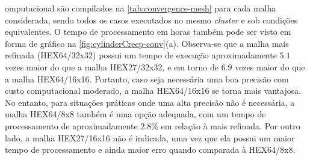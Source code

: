 \documentclass[Tese.tex]{subfiles}
\begin{document}
{omputacional são compilados na \autoref{tab:convergence-mesh} para cada malha considerada, sendo todos os casos executados no mesmo \emph{cluster} e sob condições equivalentes. O tempo de processamento em horas também pode ser visto em forma de gráfico na \cref{fig:cylinderCreep-conv}(a). Observa-se que a malha mais refinada (HEX64/32x32) possui um tempo de execução aproximadamente $5.1$ vezes maior do que a malha HEX27/32x32, e em torno de $6.9$ vezes maior do que a malha HEX64/16x16. Portanto, caso seja necessária uma boa precisão com custo computacional moderado, a malha HEX64/16x16 se torna mais vantajosa. No entanto, para situações práticas onde uma alta precisão não é necessária, a malha HEX64/8x8 também é uma opção adequada, com um tempo de processamento de aproximadamente $2.8\%$ em relação à mais refinada. Por outro lado, a malha HEX27/16x16 não é indicada, uma vez que ela possui um maior tempo de processamento e ainda maior erro quando comparada à HEX64/8x8.

}
\end{document}
